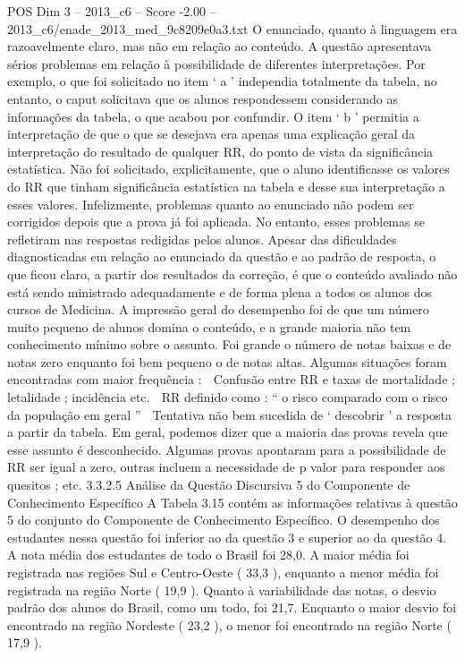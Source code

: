 \begin{textsample}{POS Dim 3 – 2013\_c6 – Score -2.00 – 2013\_c6/enade\_2013\_med\_9c8209e0a3.txt}
O enunciado, quanto à linguagem era razoavelmente claro, mas não em relação ao conteúdo.
A questão apresentava sérios problemas em relação à possibilidade de diferentes interpretações.
Por exemplo, o que foi solicitado no item ‘ a ’ independia totalmente da tabela, no entanto, o caput solicitava que os alunos respondessem considerando as informações da tabela, o que acabou por confundir.
O item ‘ b ’ permitia a interpretação de que o que se desejava era apenas uma explicação geral da interpretação do resultado de qualquer RR, do ponto de vista da significância estatística.
Não foi solicitado, explicitamente, que o aluno identificasse os valores do RR que tinham significância estatística na tabela e desse sua interpretação a esses valores.
Infelizmente, problemas quanto ao enunciado não podem ser corrigidos depois que a prova já foi aplicada.
No entanto, esses problemas se refletiram nas respostas redigidas pelos alunos.
Apesar das dificuldades diagnosticadas em relação ao enunciado da questão e ao padrão de resposta, o que ficou claro, a partir dos resultados da correção, é que o conteúdo avaliado não está sendo ministrado adequadamente e de forma plena a todos os alunos dos cursos de Medicina.
A impressão geral do desempenho foi de que um número muito pequeno de alunos domina o conteúdo, e a grande maioria não tem conhecimento mínimo sobre o assunto.
Foi grande o número de notas baixas e de notas zero enquanto foi bem pequeno o de notas altas.
Algumas situações foram encontradas com maior frequência :  Confusão entre RR e taxas de mortalidade ; letalidade ; incidência etc.  RR definido como : “ o risco comparado com o risco da população em geral ”  Tentativa não bem sucedida de ‘ descobrir ’ a resposta a partir da tabela.
Em geral, podemos dizer que a maioria das provas revela que esse assunto é desconhecido.
Algumas provas apontaram para a possibilidade de RR ser igual a zero, outras incluem a necessidade de p valor para responder aos quesitos ; etc. 3.3.2.5 Análise da Questão Discursiva 5 do Componente de Conhecimento Específico A Tabela 3.15 contém as informações relativas à questão 5 do conjunto do Componente de Conhecimento Específico.
O desempenho dos estudantes nessa questão foi inferior ao da questão 3 e superior ao da questão 4.
A nota média dos estudantes de todo o Brasil foi 28,0.
A maior média foi registrada nas regiões Sul e Centro-Oeste ( 33,3 ), enquanto a menor média foi registrada na região Norte ( 19,9 ).
Quanto à variabilidade das notas, o desvio padrão dos alunos do Brasil, como um todo, foi 21,7.
Enquanto o maior desvio foi encontrado na região Nordeste ( 23,2 ), o menor foi encontrado na região Norte ( 17,9 ).

\end{textsample}

